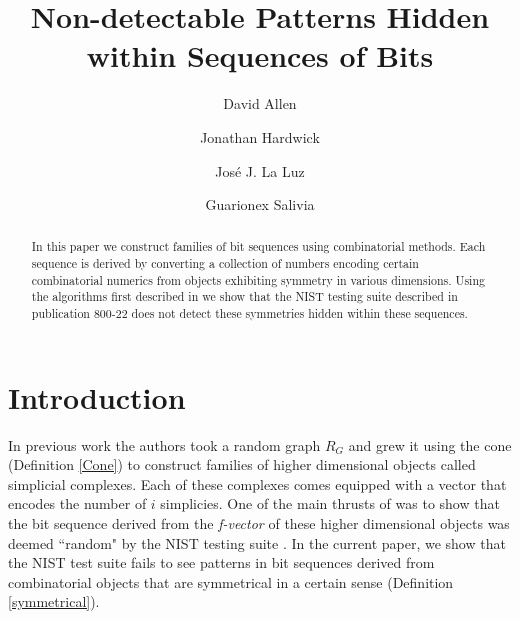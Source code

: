 \documentclass[oneside,12pt]{amsart}
\theoremstyle{definition}
\numberwithin{equation}{section}
\begin{document}
\title{Non-detectable Patterns Hidden within Sequences of Bits}

\author[D. Allen]{David Allen}
\address{Department of Mathematics BMCC, CUNY, New York, New York 10007}

\author[J. Hardwick]{Jonathan Hardwick}
\address{Department of Computer Science, Minnesota state University, Mankato,
South Rd and Ellis Ave, Mankato, MN 56001}



\author[J. La Luz]{Jos\'{e} J. La Luz}
\address{Departmento de Matem\'aticas, Universidad de Puerto Rico,
Industrial Minillas 170 Car 174, Bayam\'on, PR, 00959-1919}

\author[G. Salivia]{Guarionex Salivia}
\address{Department of Mathematics, Computer Science and Statistics, Gustavus Adolphus College, 800 West College Avenue
Saint Peter, MN 56082}


\begin{abstract}
In this paper we construct families of bit sequences using combinatorial methods.  Each sequence is derived by converting a collection of numbers encoding certain combinatorial numerics from objects exhibiting symmetry in various dimensions.  Using the algorithms first described in \cite{ALDH} we show that the NIST testing suite described in publication 800-22 does not detect these symmetries hidden within these sequences.

\end{abstract}

\maketitle

\section{Introduction}

In previous work \cite{ALDH} the authors took a random graph $R_G$ and grew it using the cone (Definition \ref{Cone}) to construct families of higher dimensional objects called simplicial complexes.  Each of these complexes comes equipped with a vector that encodes the number of $i$ simplicies.  One of the main thrusts of \cite{ALDH} was to show that the bit sequence derived from the \textit{f-vector} of these higher dimensional objects was deemed ``random" by the NIST testing suite \cite{NIST}.  In the current paper, we show that the NIST test suite fails to see patterns in bit sequences derived from combinatorial objects that are symmetrical in a certain sense (Definition \ref{symmetrical}).
\end{document}
